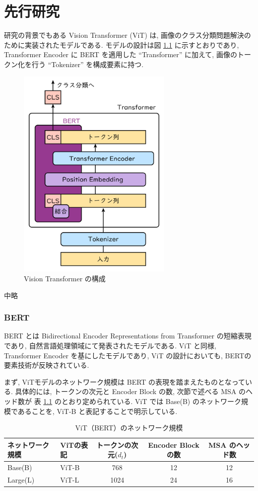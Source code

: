 \chapter{先行研究}
\label{sec:RecentWorks}

研究の背景でもある Vision Transformer (ViT) \cite{Dosovitskiy_2021} は,
画像のクラス分類問題解決のために実装されたモデルである. 
モデルの設計は図 \ref{fig:vit_design} に示すとおりであり, 
Transformer Encoder \cite{Vaswani_2017} に BERT \cite{Devlin_2019} を適用した
``Transformer'' に加えて, 画像のトークン化を行う ``Tokenizer'' を構成要素に持つ. 
\begin{figure}[ht]
  \centering
  \includegraphics[keepaspectratio, width=75mm]{figure/vit_design.png}
  \caption{Vision Transformer の構成}
  \label{fig:vit_design}
\end{figure}

中略

\subsection{BERT}
\label{sec:bert}
BERT \cite{Devlin_2019} とは Bidirectional Encoder Representations from
Transformer の短縮表現であり, 自然言語処理領域にて発表されたモデルである.
ViT と同様, Transformer Encoder を基にしたモデルであり,
ViT の設計においても, BERTの要素技術が反映されている.

まず, ViTモデルのネットワーク規模は BERT の表現を踏まえたものとなっている.
具体的には, トークンの次元と Encoder Block の数, 次節で述べる MSA のヘッド数が
表 \ref{table:vit-netsize} のとおり定められている. 
ViT では Base(B) のネットワーク規模であることを, ViT-B と表記することで明示している. 
\begin{table}[h]
 \caption{ViT（BERT）のネットワーク規模}
 \label{table:vit-netsize}
 \centering
  \begin{tabular}{llccc}
   \hline
   ネットワーク規模 & ViTの表記 & トークンの次元($d_{t}$) & Encoder Block の数 
   & MSA のヘッド数 \\
   \hline \hline
   Base(B) & ViT-B & 768 & 12 & 12 \\
   Large(L) & ViT-L & 1024 & 24 & 16 \\
   \hline
  \end{tabular}
\end{table}

